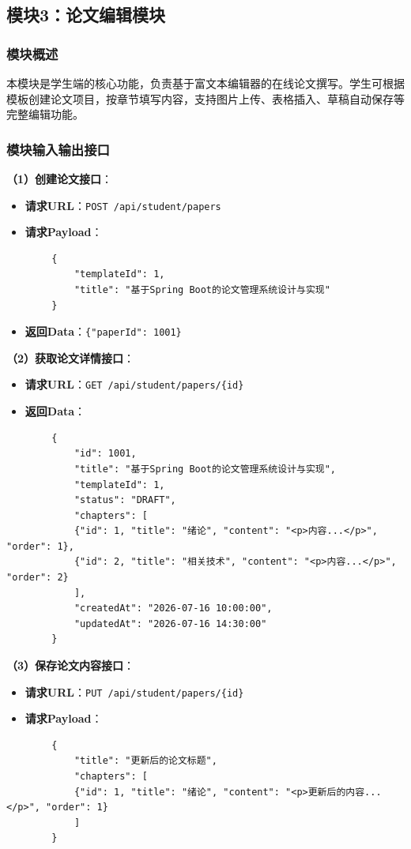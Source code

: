 \documentclass{../template/softeng}
\begin{document}
	\subsection{模块3：论文编辑模块}

	\subsubsection{模块概述}
	本模块是学生端的核心功能，负责基于富文本编辑器的在线论文撰写。学生可根据模板创建论文项目，按章节填写内容，支持图片上传、表格插入、草稿自动保存等完整编辑功能。

	\subsubsection{模块输入输出接口}

	\textbf{（1）创建论文接口}：
	\begin{itemize}
		\item \textbf{请求URL}：\texttt{POST /api/student/papers}
		\item \textbf{请求Payload}：
	\end{itemize}
	\begin{verbatim}
		{
			"templateId": 1,
			"title": "基于Spring Boot的论文管理系统设计与实现"
		}
	\end{verbatim}
	\begin{itemize}
		\item \textbf{返回Data}：\texttt{\{"paperId": 1001\}}
	\end{itemize}

	\textbf{（2）获取论文详情接口}：
	\begin{itemize}
		\item \textbf{请求URL}：\texttt{GET /api/student/papers/\{id\}}
		\item \textbf{返回Data}：
	\end{itemize}
	\begin{verbatim}
		{
			"id": 1001,
			"title": "基于Spring Boot的论文管理系统设计与实现",
			"templateId": 1,
			"status": "DRAFT",
			"chapters": [
			{"id": 1, "title": "绪论", "content": "<p>内容...</p>", "order": 1},
			{"id": 2, "title": "相关技术", "content": "<p>内容...</p>", "order": 2}
			],
			"createdAt": "2026-07-16 10:00:00",
			"updatedAt": "2026-07-16 14:30:00"
		}
	\end{verbatim}

	\textbf{（3）保存论文内容接口}：
	\begin{itemize}
		\item \textbf{请求URL}：\texttt{PUT /api/student/papers/\{id\}}
		\item \textbf{请求Payload}：
	\end{itemize}
	\begin{verbatim}
		{
			"title": "更新后的论文标题",
			"chapters": [
			{"id": 1, "title": "绪论", "content": "<p>更新后的内容...</p>", "order": 1}
			]
		}
	\end{verbatim}
\end{document}
